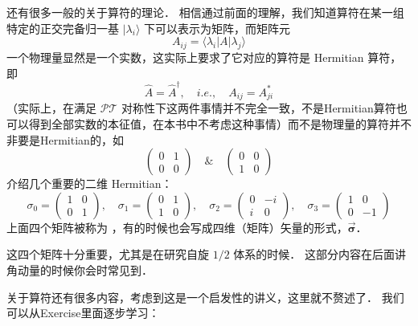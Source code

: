 还有很多一般的关于算符的理论． 相信通过前面的理解，我们知道算符在某一组特定的正交完备归一基 $|\lambda_i\rangle$ 下可以表示为矩阵，而矩阵元
\begin{equation}
A_{ij} = \langle\lambda_i|A|\lambda_j\rangle
\end{equation}
一个物理量显然是一个实数，这实际上要求了它对应的算符是 Hermitian 算符，即
\begin{equation}
\hat{A} = \hat{A}^{\dagger},\quad i.e.,\quad A_{ij} = A_{ji}^*
\end{equation}
（实际上，在满足 $\mathcal{PT}$ 对称性下这两件事情并不完全一致，不是Hermitian算符也可以得到全部实数的本征值，在本书中不考虑这种事情）而不是物理量的算符并不非要是Hermitian的，如
\begin{equation}
\left(\begin{matrix}0 & 1\\0 & 0\end{matrix}\right) \quad \& \quad \left(\begin{matrix}0 & 0\\1 & 0\end{matrix}\right)
\end{equation}
介绍几个重要的二维 Hermitian：
\begin{equation}\label{Basics_eq18}
\sigma_0 = \left(\begin{matrix}1 & 0\\0 & 1\end{matrix}\right),
\quad\sigma_1 = \left(\begin{matrix} 0 & 1\\1 & 0\end{matrix}\right),
\quad\sigma_2 = \left(\begin{matrix} 0 & -i\\i & 0\end{matrix}\right),
\quad\sigma_3 = \left(\begin{matrix} 1 & 0\\0 & -1\end{matrix}\right)  
\end{equation}
上面四个矩阵被称为 ，有的时候也会写成四维（矩阵）矢量的形式，$\vec{\bm\sigma}$．

这四个矩阵十分重要，尤其是在研究自旋 $1/2$ 体系的时候． 这部分内容在后面讲角动量的时候你会时常见到．

关于算符还有很多内容，考虑到这是一个启发性的讲义，这里就不赘述了． 我们可以从Exercise里面逐步学习：

